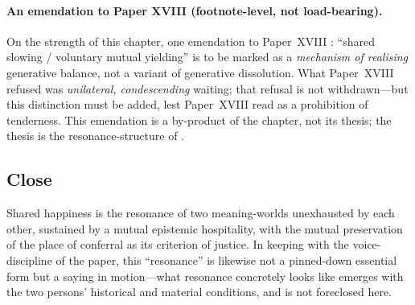 \paragraph{An emendation to Paper XVIII (footnote-level, not load-bearing).} On the strength of this chapter, one emendation to Paper~XVIII \parencite{paperxvii}: ``shared slowing / voluntary mutual yielding'' is to be marked as a \emph{mechanism of realising} generative balance, not a variant of generative dissolution. What Paper~XVIII refused was \emph{unilateral, condescending} waiting; that refusal is not withdrawn---but this distinction must be added, lest Paper~XVIII read as a prohibition of tenderness. This emendation is a by-product of the chapter, not its thesis; the thesis is the resonance-structure of .

\subsection{Close}
\label{p19:sub:coex-close}

Shared happiness is the resonance of two meaning-worlds unexhausted by each other, sustained by a mutual epistemic hospitality, with the mutual preservation of the place of conferral as its criterion of justice. In keeping with the voice-discipline of the paper, this ``resonance'' is likewise not a pinned-down essential form but a saying in motion---what resonance concretely looks like emerges with the two persons' historical and material conditions, and is not foreclosed here.

